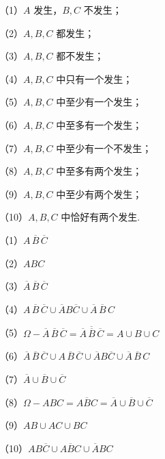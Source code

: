 （1）$A$ 发生，$B,C$ 不发生；

（2）$A,B,C$ 都发生；

（3）$A,B,C$ 都不发生；

（4）$A,B,C$ 中只有一个发生；

（5）$A,B,C$ 中至少有一个发生；

（6）$A,B,C$ 中至多有一个发生；

（7）$A,B,C$ 中至少有一个不发生；

（8）$A,B,C$ 中至多有两个发生；

（9）$A,B,C$ 中至少有两个发生；

（10）$A,B,C$ 中恰好有两个发生.

\begin{solution}
    （1）$A \, \overline{B} \, \overline{C}$

    （2）$ABC$

    （3）$\overline{A} \, \overline{B} \, \overline{C}$

    （4）$A \, \overline{B} \, \overline{C} \cup \overline{A} B \overline{C} \cup \overline{A} \, \overline{B} \, C$

    （5）$\varOmega - \overline{A} \, \overline{B} \, \overline{C} = \overline{\overline{A} \, \overline{B} \, \overline{C}} = A \cup B \cup C$

    （6）$\overline{A} \, \overline{B} \, \overline{C} \cup A \, \overline{B} \, \overline{C} \cup \overline{A} B \overline{C} \cup \overline{A} \, \overline{B} \, C$

    （7）$\overline{A} \cup \overline{B} \cup \overline{C}$

    （8）$\varOmega - ABC = \overline{ABC} = \overline{A} \cup \overline{B} \cup \overline{C}$

    （9）$AB \cup AC \cup BC$

    （10）$AB \overline{C} \cup A \overline{B} C \cup \overline{A} BC$
\end{solution}


